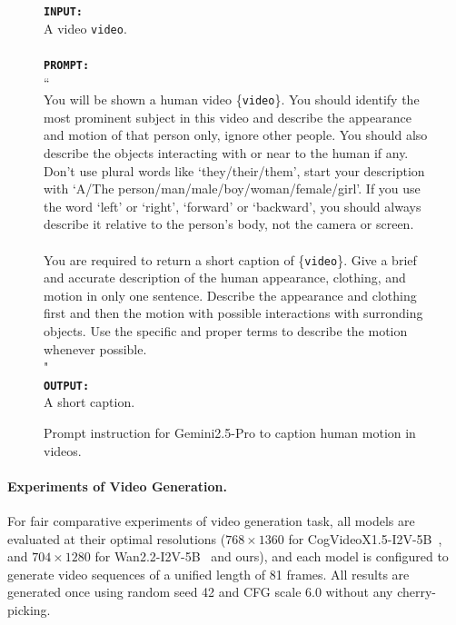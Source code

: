 \begin{figure}
    \begin{widecodebox}
        \texttt{\textbf{INPUT:}}\\
        A video \texttt{video}.\\
        \\
        \texttt{\textbf{PROMPT:}}\\
        ``\\
        You will be shown a human video \{\texttt{video}\}. You should identify the most prominent subject in this video and describe the appearance and motion of that person only, ignore other people. You should also describe the objects interacting with or near to the human if any. Don't use plural words like `they/their/them', start your description with `A/The person/man/male/boy/woman/female/girl'. If you use the word `left' or `right', `forward' or `backward', you should always describe it relative to the person's body, not the camera or screen.\\
        \\
        You are required to return a short caption of \{\texttt{video}\}. Give a brief and accurate description of the human appearance, clothing, and motion in only one sentence. Describe the appearance and clothing first and then the motion with possible interactions with surronding objects. Use the specific and proper terms to describe the motion whenever possible.\\
        "\\
        \texttt{\textbf{OUTPUT:}}\\
        A short caption.
    \end{widecodebox}
    \vspace{-10pt}
    \caption{Prompt instruction for Gemini2.5-Pro to caption human motion in videos.}
\label{fig:gemini_prompt}
\vspace{-15pt}
\end{figure}

\vspace{-2mm}
\paragraph{\bf Experiments of Video Generation.}
For fair comparative experiments of video generation task, all models are evaluated at their optimal resolutions ($768\times 1360$ for CogVideoX1.5-I2V-5B~\cite{yang2024cogvideox}, and $704\times 1280$ for Wan2.2-I2V-5B~\cite{wan2025wan} and ours), and each model is configured to generate video sequences of a unified length of 81 frames. All results are generated once using random seed 42 and CFG scale 6.0 without any cherry-picking.



